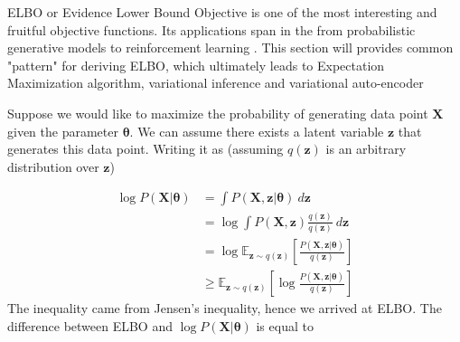 ELBO or Evidence Lower Bound Objective is one of the most interesting and fruitful objective functions. Its applications span in the from probabilistic generative models \cite{kingma2013auto} to reinforcement learning \cite{levine2018reinforcement}. This section will provides common "pattern" for deriving ELBO, which ultimately leads to Expectation Maximization algorithm, variational inference and variational auto-encoder \cite{kingma2013auto}  

Suppose we would like to maximize the probability of generating data point $\boldsymbol{X}$ given the parameter $\boldsymbol{\theta}$. We can assume there exists a latent variable $\boldsymbol{z}$ that generates this data point. Writing it as (assuming $q(\boldsymbol{z})$ is an arbitrary distribution over $\boldsymbol{z}$)

\begin{equation}
    \begin{aligned}
         \log P(\boldsymbol{X} | \boldsymbol{\theta}) &= \int P(\boldsymbol{X}, \boldsymbol{z} | \boldsymbol{\theta}) \ d\boldsymbol{z} \\
         &= \log \int P(\boldsymbol{X}, \boldsymbol{z}) \frac{q(\boldsymbol{z})}{q(\boldsymbol{z})} \ d \boldsymbol{z} \\
         &= \log \mathbb{E}_{\boldsymbol{z} \sim q(\boldsymbol{z})} \left[ \frac{P(\boldsymbol{X}, \boldsymbol{z} | \boldsymbol{\theta})}{q(\boldsymbol{z})} \right] \\
         &\ge \mathbb{E}_{\boldsymbol{z} \sim q(\boldsymbol{z})} \left[ \log\frac{P(\boldsymbol{X}, \boldsymbol{z} | \boldsymbol{\theta})}{q(\boldsymbol{z})} \right]
    \end{aligned}
\end{equation}
The inequality came from Jensen's inequality, hence we arrived at ELBO. The difference between ELBO and $\log P(\boldsymbol{X} |\boldsymbol{\theta})$ is equal to 

